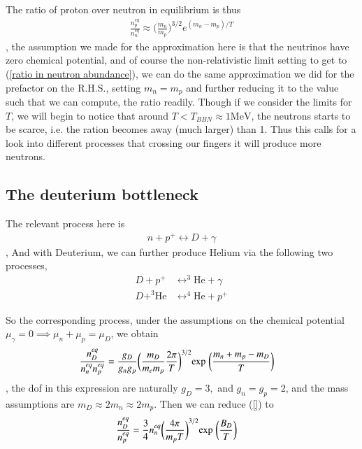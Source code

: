 \documentclass[a4paper, 12pt]{article}
\begin{document}
{{    The ratio of proton over neutron in equilibrium is thus 
    \begin{align}
      \label{ratio in neutron abundance}
      \frac{n_{p}^{eq}}{n_{n}^{eq}} \approx \bigg(\frac{m_n}{m_p}
      \bigg)^{3/2} e^{(m_n-m_p)/T} 
    \end{align}, the assumption we made for the approximation here is that the
neutrinos have zero chemical potential, and of course the non-relativistic
limit setting to get to (\ref{ratio in neutron abundance}), we can do the
same approximation we did for the prefactor on the \textnormal{R.H.S.},
setting \( m_n = m_p \) and further reducing it to the value such that we can
compute, the ratio readily. Though if we consider the limits for \( T \), we
will begin to notice that around \( T < T_{BBN} \approx 1 \mathrm{MeV}
\), the neutrons starts to be scarce, i.e. the ration becomes away (much
larger) than 1. Thus this calls for a look into different processes
that crossing our fingers it will produce more neutrons. 

\subsection{The deuterium bottleneck}%
  \label{sub:The deuterium bottleneck}
  The relevant process here is 
  \begin{align}
    \label{deuterium process}
    n + p^+ \leftrightarrow D + \gamma
  \end{align}, 
  And with Deuterium, we can further produce Helium via the following
  two processes, 
  \begin{align}
    \label{helium processes 1}
    D + p^+ &\leftrightarrow^3 \mathrm{He} + \gamma \\ 
    \label{helium processes 2}D + ^3\mathrm{He} &\leftrightarrow^4 \mathrm{He} + p^+
  \end{align}

  So the corresponding process, under the assumptions on the chemical
  potential \( \mu_{\gamma} = 0 \implies \mu_{n} + \mu_{p} = \mu_{D}
  \), we obtain 
  \begin{align}
    \label{deuterium ratio}
   \frac{n_{D}^{eq}}{n_{n}^{eq} n_{p}^{eq}} &= \frac{g_D}{g_n g_p} \bigg(
  \frac{m_D}{m_e m_p} \frac{2\pi}{T} \bigg)^{3/2} \mathrm{exp}
  \hspace{0.1cm} \bigg( \frac{m_n + m_p - m_D}{T} \bigg) 
  \end{align}, the dof in this expression are naturally \( g_D = 3, \) and
  \( g_n = g_p = 2 \), and the mass assumptions are \( m_D \approx
  2m_n \approx 2 m_p \).
  Then we can reduce (\ref{}) to 
  \begin{align}
    \label{simplified deuterium ratio}
   \frac{n_{D}^{eq}}{n_{p}^{eq}} &= \frac{3}{4} n_{n}^{eq}
    \bigg(\frac{4\pi}{m_p T} \bigg)^{3/2} \mathrm{exp} \hspace{0.1cm}
    \bigg( \frac{B_D}{T} \bigg)   
  \end{align}
  
}}
\end{document}

